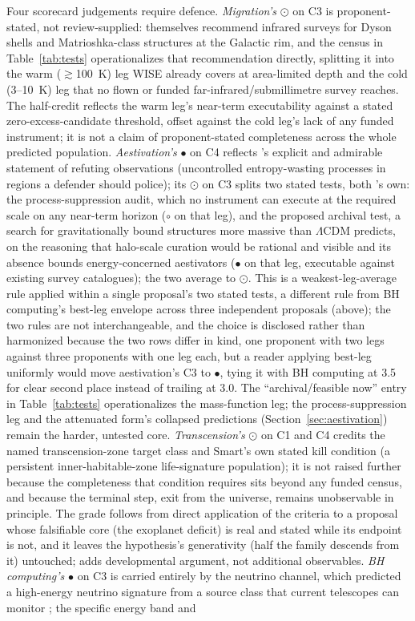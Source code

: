 \documentclass[11pt]{article}
\newcommand{\sfull}{\ensuremath{\bullet}}   %
\newcommand{\shalf}{\ensuremath{\odot}} %
\newcommand{\snone}{\ensuremath{\circ}}     %
\begin{document}
Four scorecard judgements require defence. \emph{Migration's} \shalf{} on C3 is proponent-stated, not review-supplied: \citet{CirkovicBradbury2006} themselves recommend infrared surveys for Dyson shells and Matrioshka-class structures at the Galactic rim, and the census in Table~\ref{tab:tests} operationalizes that recommendation directly, splitting it into the warm ($\gtrsim$100~K) leg WISE already covers at area-limited depth and the cold (3--10~K) leg that no flown or funded far-infrared/submillimetre survey reaches. The half-credit reflects the warm leg's near-term executability against a stated zero-excess-candidate threshold, offset against the cold leg's lack of any funded instrument; it is not a claim of proponent-stated completeness across the whole predicted population. \emph{Aestivation's} \sfull{} on C4 reflects \citet{Sandberg2016}'s explicit and admirable statement of refuting observations (uncontrolled entropy-wasting processes in regions a defender should police); its \shalf{} on C3 splits two stated tests, both \citet{Sandberg2016}'s own: the process-suppression audit, which no instrument can execute at the required scale on any near-term horizon (\snone{} on that leg), and the proposed archival test, a search for gravitationally bound structures more massive than $\Lambda$CDM predicts, on the reasoning that halo-scale curation would be rational and visible and its absence bounds energy-concerned aestivators (\sfull{} on that leg, executable against existing survey catalogues); the two average to \shalf{}. This is a weakest-leg-average rule applied within a single proposal's two stated tests, a different rule from BH computing's best-leg envelope across three independent proposals (above); the two rules are not interchangeable, and the choice is disclosed rather than harmonized because the two rows differ in kind, one proponent with two legs against three proponents with one leg each, but a reader applying best-leg uniformly would move aestivation's C3 to \sfull{}, tying it with BH computing at 3.5 for clear second place instead of trailing at 3.0. The ``archival/feasible now'' entry in Table~\ref{tab:tests} operationalizes the mass-function leg; the process-suppression leg and the attenuated form's collapsed predictions (Section~\ref{sec:aestivation}) remain the harder, untested core. \emph{Transcension's} \shalf{} on C1 and C4 credits the named transcension-zone target class and Smart's own stated kill condition (a persistent inner-habitable-zone life-signature population); it is not raised further because the completeness that condition requires sits beyond any funded census, and because the terminal step, exit from the universe, remains unobservable in principle. The grade follows from direct application of the criteria to a proposal whose falsifiable core (the exoplanet deficit) is real and stated while its endpoint is not, and it leaves the hypothesis's generativity (half the family descends from it) untouched; \citet{Smart2019} adds developmental argument, not additional observables. \emph{BH computing's} \sfull{} on C3 is carried entirely by the \citet{Dvali2023} neutrino channel, which predicted a high-energy neutrino signature from a source class that current telescopes can monitor \citep{KM3NeT2025,IceCubePS2020}; the specific energy band and 
\end{document}
